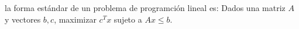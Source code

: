 \documentclass{article}
\begin{document}
la forma estándar de un problema de programción lineal es:
Dados una matriz $A$ y vectores $b,c$, maximizar $c^Tx$ sujeto a
$Ax\leq b$.
\end{document}
